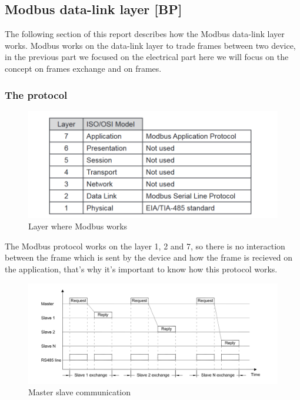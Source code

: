 		
		\subsection{Modbus data-link layer [BP]}
		\label{sec:modbus-data-link-layer}
		The following section of this report describes how the Modbus data-link layer works. Modbus works on the data-link layer to trade frames between two device, in the previous part we focused on the electrical part here we will focus on the concept on frames exchange and on frames. 
			
			\subsubsection{The protocol}
				
				\begin{figure}[H]
					\centering
					\includegraphics[width=0.7\linewidth]{assets/data-link-layer.png}\qquad
					\caption{Layer where Modbus works~\cite{Modbus-protocol}}
						
					\label{fig:modbus-data-link}
				\end{figure}
			
				The Modbus protocol works on the layer 1, 2 and 7, so there is no interaction between the frame which is sent by the device and how the frame is recieved on the application, that's why it's important to know how this protocol works.
			
				\begin{figure}[H]
					\centering
					\includegraphics[width=0.9\linewidth]{assets/master-slave-communication.png}\qquad
					\caption{Master slave communication~\cite{Modbus-protocol}} 
					\label{fig:modbus-master-slave-comm}
				\end{figure}
				
